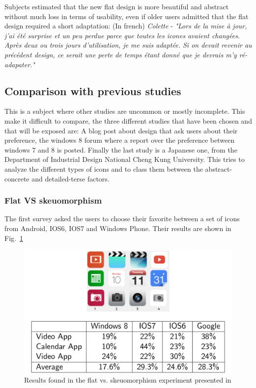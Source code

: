 \documentclass[a4paper,11pt] {article}
\theoremstyle{definition}
\begin{document}
    Subjects estimated that the new flat design is more beautiful and abstract without much loss in terms of usability, even if older users admitted that the flat design required a short adaptation:
  	(In french) \textit{Colette} - \textit{"Lors de la mise à jour, j'ai été surprise et un peu perdue parce que toutes les icones avaient changées. Après deux ou trois jours d'utilisation, je me suis adaptée. Si on devait revenir au précédent design, ce serait une perte de temps étant donné que je devrais m'y ré-adapater."}

    \subsection{Comparison with previous studies}
    This is a subject where other studies are uncommon or mostly incomplete. This make it difficult to compare, the three different studies that have been chosen and that will be exposed are: A blog post about design that ask users about their preference, the windows 8 forum where a report over the preference between windows 7 and 8 is posted. Finally the last study is a Japanese one, from the Department of Industrial Design National Cheng Kung University. This tries to analyze the different types of icons and to class them between the abstract-concrete and detailed-terse factors.

    \subsubsection{Flat VS skeuomorphism}

    The first survey \cite{flatVSskeuomorphisme} asked the users to choose their favorite between a set of icons from Android, IOS6, IOS7 and Windows Phone. Their results are shown in Fig.~\ref{fig:flat-vs-skeu-result}\\

    \begin{figure}[h]
    \centering
    \includegraphics[scale=0.3]{fig-report/flatVSskeuomorphism.png}
    \caption{Results found in the flat vs. skeuomorphism experiment presented in \cite{flatVSskeuomorphisme}}
    \label{fig:flat-vs-skeu-result}
    \end{figure}
\end{document}
